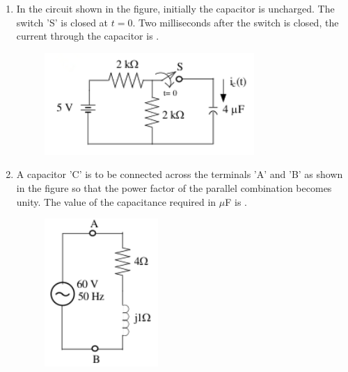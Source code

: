 \documentclass[journal,12pt,onecolumn]{IEEEtran}
\theoremstyle{remark}
\begin{document}
\begin{enumerate}
    \hfill{}
        \begin{enumerate}
        \end{enumerate}
    
    \item In the circuit shown in the figure, initially the capacitor is uncharged. The switch 'S' is closed at $t=0$. Two milliseconds after the switch is closed, the current through the capacitor  is \underline{\hspace{2cm}}.
    \begin{figure}[H]
        \centering
        \includegraphics[width=0.4\columnwidth]{q29}
        \caption*{}
        \label{fig:q29}
    \end{figure}

    \hfill{}
    
    \item A capacitor 'C' is to be connected across the terminals 'A' and 'B' as shown in the figure so that the power factor of the parallel combination becomes unity. The value of the capacitance required in $\mu$F is \underline{\hspace{2cm}}.
    \begin{figure}[H]
        \centering
        \includegraphics[width=0.4\columnwidth]{q30}
        \caption*{}
        \label{fig:q30}
    \end{figure}


\end{enumerate}
\end{document}
